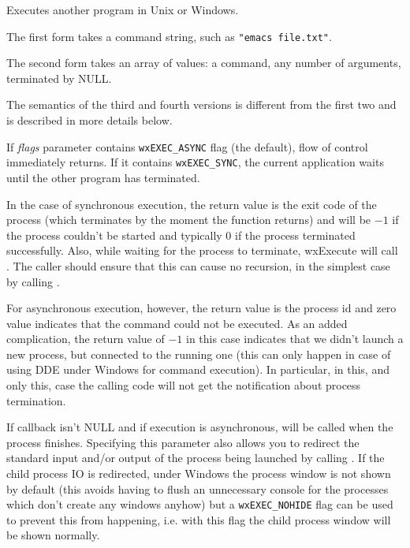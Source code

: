 


Executes another program in Unix or Windows.

The first form takes a command string, such as {\tt "emacs file.txt"}.

The second form takes an array of values: a command, any number of
arguments, terminated by NULL.

The semantics of the third and fourth versions is different from the first two
and is described in more details below.

If {\it flags} parameter contains {\tt wxEXEC\_ASYNC} flag (the default), flow
of control immediately returns. If it contains {\tt wxEXEC\_SYNC}, the current
application waits until the other program has terminated.

In the case of synchronous execution, the return value is the exit code of
the process (which terminates by the moment the function returns) and will be
$-1$ if the process couldn't be started and typically 0 if the process
terminated successfully. Also, while waiting for the process to
terminate, wxExecute will call . The caller
should ensure that this can cause no recursion, in the simplest case by
calling .

For asynchronous execution, however, the return value is the process id and
zero value indicates that the command could not be executed. As an added
complication, the return value of $-1$ in this case indicates that we didn't
launch a new process, but connected to the running one (this can only happen in
case of using DDE under Windows for command execution). In particular, in this,
and only this, case the calling code will not get the notification about
process termination.

If callback isn't NULL and if execution is asynchronous,
 will be called when
the process finishes. Specifying this parameter also allows you to redirect the
standard input and/or output of the process being launched by calling
. If the child process IO is redirected,
under Windows the process window is not shown by default (this avoids having to
flush an unnecessary console for the processes which don't create any windows
anyhow) but a {\tt wxEXEC\_NOHIDE} flag can be used to prevent this from
happening, i.e. with this flag the child process window will be shown normally.

